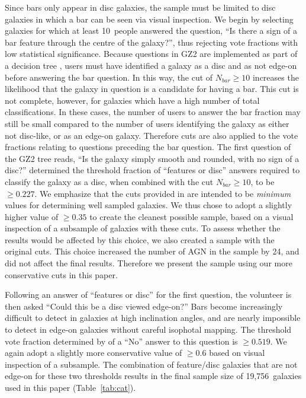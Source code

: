 Since bars only appear in disc galaxies, the sample must be limited to disc galaxies in which a bar can be seen via visual inspection. We begin by selecting galaxies for which at least 10~people answered the question, ``Is there a sign of a bar feature through the centre of the galaxy?'', thus rejecting vote fractions with low statistical significance. Because questions in GZ2 are implemented as part of a decision tree \citep{Willett2013}, users must have identified a galaxy as a disc and as not edge-on before answering the bar question. In this way, the cut of $N_{bar}\ge10$ increases the likelihood that the galaxy in question is a candidate for having a bar. This cut is not complete, however, for galaxies which have a high number of total classifications. In these cases, the number of users to answer the bar fraction may still be small compared to the number of users identifying the galaxy as either not disc-like, or as an edge-on galaxy. Therefore cuts are also applied to the vote fractions relating to questions preceding the bar question. The first question of the GZ2 tree reads, ``Is the galaxy simply smooth and rounded, with no sign of a disc?'' \citet{Willett2013} determined the threshold fraction of ``features or disc'' answers required to classify the galaxy as a disc, when combined with the cut $N_{bar}\ge10$, to be \pfeatures$\ge0.227$. We emphasize that the cuts provided in \citet{Willett2013} are intended to be \emph{minimum} values for determining well sampled galaxies. We thus chose to adopt a slightly higher value of \pfeatures$\ge0.35$ to create the cleanest possible sample, based on a visual inspection of a subsample of galaxies with these cuts. To assess whether the results would be affected by this choice, we also created a sample with the original \citet{Willett2013} cuts. This choice increased the number of AGN in the sample by 24, and did not affect the final results. Therefore we present the sample using our more conservative cuts in this paper. 

Following an answer of ``features or disc'' for the first question, the volunteer is then asked ``Could this be a disc viewed edge-on?'' Bars become increasingly difficult to detect in galaxies at high inclination angles, and are nearly impossible to detect in edge-on galaxies without careful isophotal mapping. The threshold vote fraction determined by \citet{Willett2013} of a ``No'' answer to this question is \pnotedgeon$\ge0.519$. We again adopt a slightly more conservative value of \pnotedgeon$\ge0.6$ based on visual inspection of a subsample. The combination of feature/disc galaxies that are not edge-on for these two thresholds results in the final sample size of 19,756~galaxies used in this paper (Table~\ref{tab:cat}). 

